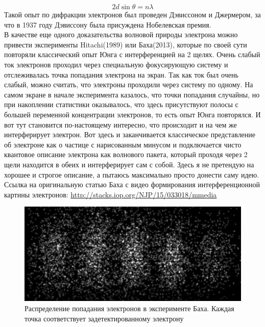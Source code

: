 \documentclass[12pt]{article}
\begin{document}
\begin{equation*}
    2d\sin{\theta} = n\lambda
\end{equation*}
Такой опыт по дифракции электронов был проведен Дэвиссоном и Джермером, за что в 1937 году Дэвиссону была присуждена Нобелевская премия. \\
В качестве еще одного доказательства волновой природы электрона можно привести эксперименты Hitachi(1989) или Баха(2013),  которые по своей сути повторяли классический опыт Юнга с интерференцией на 2 щелях. Очень слабый ток электронов проходил через специальную фокусирующую систему и отслеживалась точка попадания электрона на экран. Так как ток был очень слабый, можно считать, что электроны проходили через систему по одному. На самом экране в начале эксперимента казалось, что точки попадания случайны, но при накоплении статистики оказывалось, что здесь присутствуют полосы с большей переменной концентрации электронов, то есть опыт Юнга повторялся. И вот тут становится по-настоящему интересно, что происходит и на чем же интерферирует электрон. Вот здесь и заканчивается классическое представление об электроне как о частице с нарисованным минусом и подключается чисто квантовое описание электрона как волнового пакета, который проходя через 2 щели находится в обеих и интерферирует сам с собой. Здесь я не претендую на хорошее и строгое описание, а пытаюсь максимально просто донести саму идею. Ссылка на оригинальную статью Баха с видео формирования интерференционной картины электронов: \url{http://stacks.iop.org/NJP/15/033018/mmedia}
\begin{figure}[h]
    \centering
    \includegraphics[width=\textwidth,height=\textheight,keepaspectratio]{Seminar_03/pics/pic_01.png}
    \caption{Распределение попадания электронов в эксперименте Баха. Каждая точка соответствует задетектированному электрону}
    \label{fig:sem_03_bach_experiment}
\end{figure}
\end{document}
